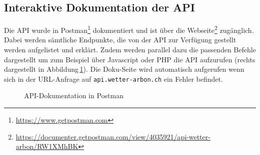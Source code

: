 \subsection{Interaktive Dokumentation der API}
Die API wurde in Postman\footnote{\url{https://www.getpostman.com}} dokumentiert und ist über die Webseite\footnote{\url{https://documenter.getpostman.com/view/4035921/api-wetter-arbon/RW1XMhBK}} zugänglich. Dabei werden sämtliche Endpunkte, die von der API zur Verfügung gestellt werden aufgelistet und erklärt. Zudem werden parallel dazu die passenden Befehle dargestellt um zum Beispiel über Javascript oder PHP die API aufzurufen (rechts dargestellt in Abbildung\,\ref{img:postman}). Die Doku-Seite wird automatisch aufgerufen wenn sich in der URL-Anfrage auf \texttt{api.wetter-arbon.ch} ein Fehler befindet.

\begin{figure}[htbp!]
	\centering
	\caption{API-Dokumentation in Postman}
	\label{img:postman}
\end{figure}



